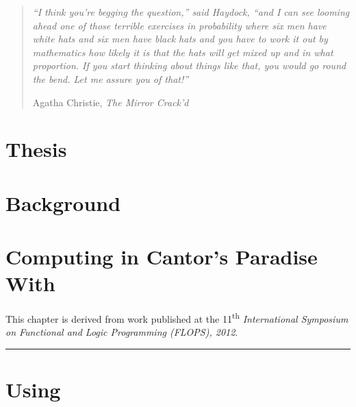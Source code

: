 \documentclass[phd,electronic,twosidetoc,letterpaper,chaptercenter,parttop,lof]{byumsphd}
\title{\Title}
\author{\Author}
\begin{document}
\maketitle
{}

\vspace*{\fill}
\begin{quote}
\textit{``I think you're begging the question,'' said Haydock, ``and I can see looming ahead one of those terrible exercises in probability where six men have white hats and six men have black hats and you have to work it out by mathematics how likely it is that the hats will get mixed up and in what proportion. If you start thinking about things like that, you would go round the bend. Let me assure you of that!''}

\hfill Agatha Christie, \textit{The Mirror Crack'd}
\end{quote}
\vspace*{\fill}

\chapter{Thesis}




\chapter{Background}
\label{ch:background}




\chapter{Computing in Cantor's Paradise With \lzfclang}
\label{ch:lambda-zfc}

This chapter is derived from work published at the 11\textsuperscript{th} \emph{International Symposium on Functional and Logic Programming (FLOPS), 2012}.

\vspace{\baselineskip}
\hrule
\vspace{\baselineskip}




\chapter{Using \lzfclang}
\label{ch:using-lambda-zfc}
\end{document}
